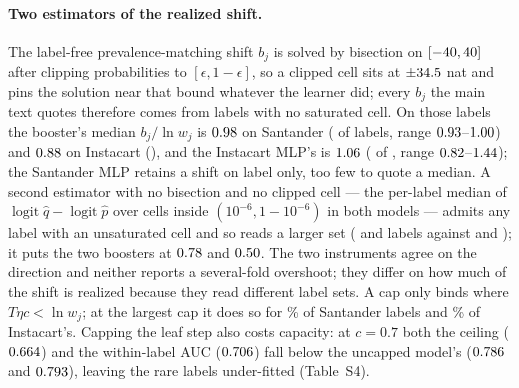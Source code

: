 \documentclass[sigconf,nonacm]{acmart}
\begin{document}
\paragraph{Two estimators of the realized shift.} The label-free prevalence-matching shift $b_j$ is solved by bisection on $[-40,40]$ after clipping probabilities to $[\epsilon,1-\epsilon]$, so a clipped cell sits at $\pm34.5$ nat and pins the solution near that bound whatever the learner did; every $b_j$ the main text quotes therefore comes from labels with no saturated cell. On those labels the booster's median $b_j/\ln w_j$ is $0.98$ on Santander (\nSnIdentShift{} of \nnLabels{} labels, range $0.93$--$1.00$) and $0.88$ on Instacart (\nISnIdentShift), and the Instacart MLP's is $1.06$ (\nIMSnIdentShift{} of \nInLabels, range $0.82$--$1.44$); the Santander MLP retains a shift on \nMSnIdentShift{} label only, too few to quote a median. A second estimator with no bisection and no clipped cell --- the per-label median of $\operatorname{logit}\hat q-\operatorname{logit}\hat p$ over cells inside $(10^{-6},1-10^{-6})$ in both models --- admits any label with an unsaturated cell and so reads a larger set (\nSnDirectShift{} and \nISnDirectShift{} labels against \nSnIdentShift{} and \nISnIdentShift); it puts the two boosters at $0.78$ and $0.50$. The two instruments agree on the direction and neither reports a several-fold overshoot; they differ on how much of the shift is realized because they read different label sets. A cap only binds where $T\eta c<\ln w_j$; at the largest cap it does so for \nSmdsFivefracLnwAbove\% of Santander labels and \nISmdsFivefracLnwAbove\% of Instacart's. Capping the leaf step also costs capacity: at $c=0.7$ both the ceiling ($0.664$) and the within-label AUC ($0.706$) fall below the uncapped model's ($0.786$ and $0.793$), leaving the rare labels under-fitted (Table~S4).
\end{document}

